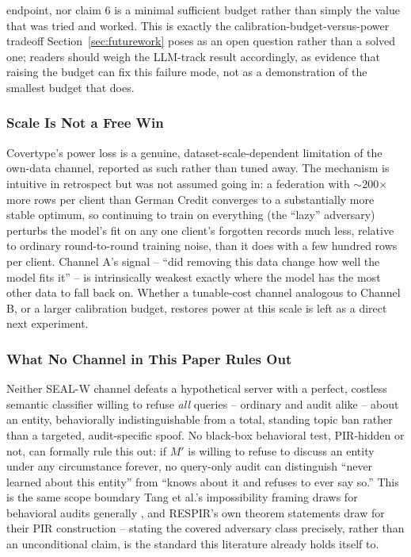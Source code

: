 \documentclass[10pt,journal,compsoc]{IEEEtran}
\begin{document}
endpoint, nor claim 6 is a minimal sufficient budget rather than simply the value that was tried and worked. This is exactly the calibration-budget-versus-power tradeoff Section~\ref{sec:futurework} poses as an open question rather than a solved one; readers should weigh the LLM-track result accordingly, as evidence that raising the budget can fix this failure mode, not as a demonstration of the smallest budget that does.

\subsubsection{Scale Is Not a Free Win}

Covertype's power loss is a genuine, dataset-scale-dependent limitation of the own-data channel, reported as such rather than tuned away. The mechanism is intuitive in retrospect but was not assumed going in: a federation with $\sim$200$\times$ more rows per client than German Credit converges to a substantially more stable optimum, so continuing to train on everything (the ``lazy'' adversary) perturbs the model's fit on any one client's forgotten records much less, relative to ordinary round-to-round training noise, than it does with a few hundred rows per client. Channel A's signal -- ``did removing this data change how well the model fits it'' -- is intrinsically weakest exactly where the model has the most other data to fall back on. Whether a tunable-cost channel analogous to Channel B, or a larger calibration budget, restores power at this scale is left as a direct next experiment.

\subsubsection{What No Channel in This Paper Rules Out}

Neither SEAL-W channel defeats a hypothetical server with a perfect, costless semantic classifier willing to refuse \emph{all} queries -- ordinary and audit alike -- about an entity, behaviorally indistinguishable from a total, standing topic ban rather than a targeted, audit-specific spoof. No black-box behavioral test, PIR-hidden or not, can formally rule this out: if $M'$ is willing to refuse to discuss an entity under any circumstance forever, no query-only audit can distinguish ``never learned about this entity'' from ``knows about it and refuses to ever say so.'' This is the same scope boundary Tang et al.'s impossibility framing draws for behavioral audits generally \cite{tang2026geometric}, and RESPIR's own theorem statements draw for their PIR construction \cite{godinot2026respir} -- stating the covered adversary class precisely, rather than an unconditional claim, is the standard this literature already holds itself to.
\end{document}
